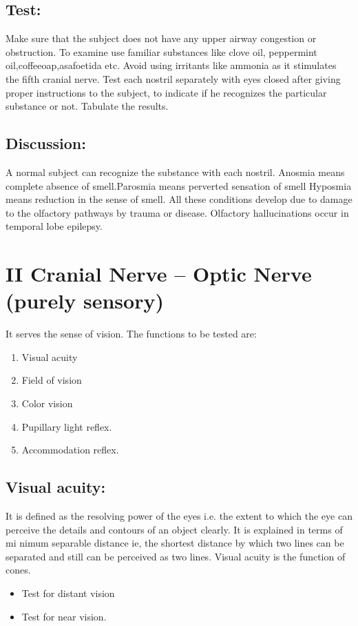 \documentclass[a4paper,12pt,openany,oneside]{book}
\begin{document}
\subsection*{Test:}
Make sure that the subject does not have any upper airway congestion or obstruction. To examine use familiar substances like clove oil, peppermint oil,coffeeoap,asafoetida etc. Avoid using irritants like ammonia as it stimulates the fifth cranial nerve.
Test each nostril separately with eyes closed after giving proper instructions to the subject, to indicate if he recognizes the particular substance or not. Tabulate the results.
\subsection*{Discussion:}
A normal subject can recognize the substance with each nostril.
	Anosmia means complete absence of smell.Parosmia means perverted sensation of smell Hyposmia means reduction in the sense of smell. All these conditions develop due to damage to the olfactory pathways by trauma or disease. Olfactory hallucinations occur in temporal lobe epilepsy.

		\section*{II Cranial Nerve – Optic Nerve (purely sensory)}
		It serves the sense of vision. The functions to be tested are:
		\begin{enumerate}
\item{Visual acuity}
\item{Field of vision}
\item{Color vision}
\item{Pupillary light reflex.}
\item{Accommodation reflex.}
		\end{enumerate}
		\subsection*{Visual acuity:}
		It is defined as the resolving power of the eyes i.e. the extent to which the eye can perceive the details and contours of an object clearly. It is explained in terms of mi nimum separable distance ie, the shortest distance by which two lines can be separated and still can be perceived as two lines. Visual acuity is the function of cones.
		\begin{itemize}
			\item[]Test for distant vision
			\item[]Test for near vision.
		\end{itemize}
\end{document}
